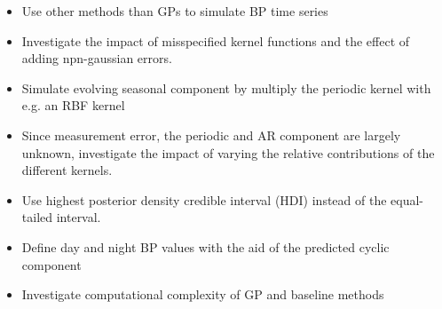 \begin{itemize}
    \item Use other methods than GPs to simulate BP time series
    \item Investigate the impact of misspecified kernel functions and the effect of adding npn-gaussian errors.
    \item Simulate evolving seasonal component by multiply the periodic kernel with e.g. an RBF kernel
    \item Since measurement error, the periodic and AR component are largely unknown,
    investigate the impact of varying the relative contributions of the different kernels.
    \item Use highest posterior density credible interval (HDI) instead of the equal-tailed interval.
    \item Define day and night BP values with the aid of the predicted cyclic component
    \item Investigate computational complexity of GP and baseline methods

\end{itemize}

